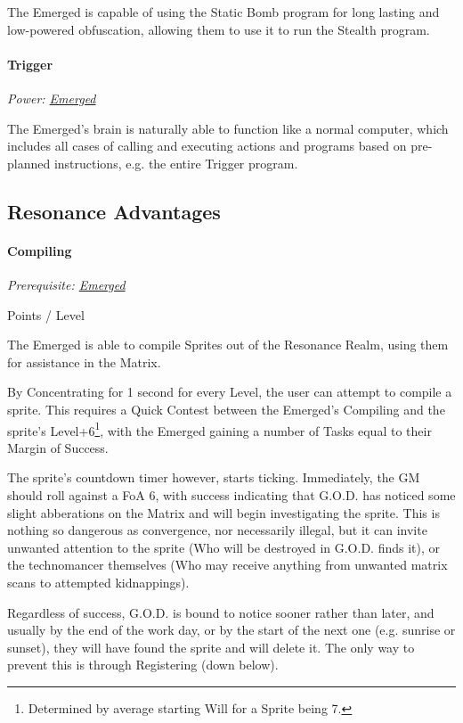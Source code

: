 \begin{multicols*}{3}
	The Emerged is capable of using the Static Bomb program for long lasting and low-powered obfuscation, allowing them to use it to run the Stealth program.
	
	\paragraph{Trigger}
	\begin{center}
	\textit{Power: \hyperref[emerged]{Emerged}}
	\end{center}

	The Emerged's brain is naturally able to function like a normal computer, which includes all cases of calling and executing actions and programs based on pre-planned instructions, e.g. the entire Trigger program.

	\subsection{Resonance Advantages}
	
	\paragraph{Compiling}\label{compiling}
	\textit{Prerequisite: \hyperref[emerged]{Emerged}}
	\begin{flushright}
		 Points / Level
	\end{flushright}

	The Emerged is able to compile Sprites out of the Resonance Realm, using them for assistance in the Matrix.
	
	By Concentrating for 1 second for every Level, the user can attempt to compile a sprite. This requires a Quick Contest between the Emerged's Compiling and the sprite's Level+6\footnote{Determined by average starting Will for a Sprite being 7.}, with the Emerged gaining a number of Tasks equal to their Margin of Success. 
	
	The sprite's countdown timer however, starts ticking. Immediately, the GM should roll against a FoA 6, with success indicating that G.O.D. has noticed some slight abberations on the Matrix and will begin investigating the sprite. This is nothing so dangerous as convergence, nor necessarily illegal, but it can invite unwanted attention to the sprite (Who will be destroyed in G.O.D. finds it), or the technomancer themselves (Who may receive anything from unwanted matrix scans to attempted kidnappings). 
	
	Regardless of success, G.O.D. is bound to notice sooner rather than later, and usually by the end of the work day, or by the start of the next one (e.g. sunrise or sunset), they will have found the sprite and will delete it. The only way to prevent this is through Registering (down below).
	

\end{multicols*}
